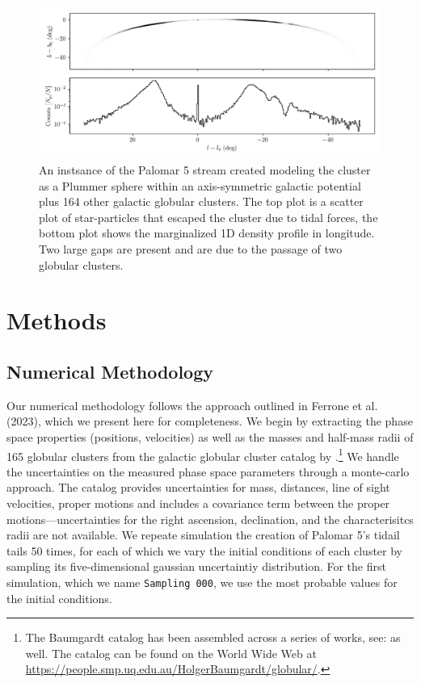 \documentclass[draft]{aa}
\begin{document}
  \begin{figure}
    \centering
    \includegraphics[width=\linewidth]{stream_on_sky_Pal5_monte-carlo-009_pouliasis2017pii-GCNBody.png}
    \caption{An instsance of the Palomar 5 stream created modeling the cluster as a Plummer sphere within an axis-symmetric galactic potential plus 164 other galactic globular clusters. The top plot is a scatter plot of star-particles that escaped the cluster due to tidal forces, the bottom plot shows the marginalized 1D density profile in longitude. Two large gaps are present and are due to the passage of two globular clusters.}
    \label{fig:stream_on_sky}
    \end{figure}








\section{Methods}

  \subsection{Numerical Methodology}
    Our numerical methodology follows the approach outlined in Ferrone et al. (2023), which we present here for completeness. We begin by extracting the phase space properties (positions, velocities) as well as the masses and half-mass radii of 165 globular clusters from the galactic globular cluster catalog by \cite{2021MNRAS.505.5957B}.\footnote{The Baumgardt catalog has been assembled across a series of works, see: \cite{2020PASA...37...46B,2019MNRAS.482.5138B,2018MNRAS.478.1520B} as well. The catalog can be found on the World Wide Web at \href{https://people.smp.uq.edu.au/HolgerBaumgardt/globular/}{https://people.smp.uq.edu.au/HolgerBaumgardt/globular/}.} We handle the uncertainties on the measured phase space parameters through a monte-carlo approach. The catalog provides uncertainties for mass, distances, line of sight velocities, proper motions and includes a covariance term between the proper motions---uncertainties for the right ascension, declination, and the characterisitcs radii are not available. We repeate simulation the creation of Palomar 5's tidail tails 50 times, for each of which we vary the initial conditions of each cluster by sampling its five-dimensional gaussian uncertaintiy distribution. For the first simulation, which we name \texttt{Sampling 000}, we use the most probable values for the initial conditions. 
\end{document}
